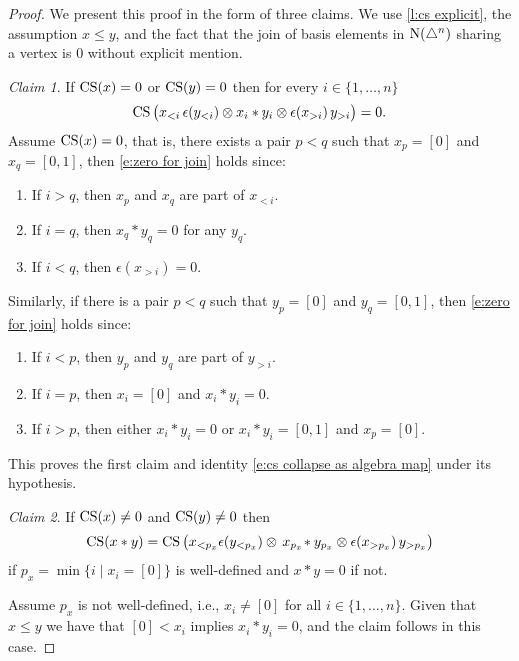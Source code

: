 \begin{proof}
	We present this proof in the form of three claims.
	We use \cref{l:cs explicit}, the assumption $x \leq y$, and the fact that the join of basis elements in $\operatorname{N}(\triangle^n)$ sharing a vertex is $0$ without explicit mention.

	\medskip\noindent \textit{Claim 1}.
	If $\operatorname{CS}(x) = 0$ or $\operatorname{CS}(y) = 0$ then for every $i \in \{1, \dots, n\}$
	\begin{equation} \label{e:zero for join}
		\operatorname{CS} \big( x_{<i}\, \epsilon(y_{<i}) \otimes x_i \ast y_i \otimes \epsilon(x_{>i}) \, y_{>i} \big) = 0.
	\end{equation}
	Assume $\operatorname{CS}(x) = 0$, that is, there exists a pair $p < q$ such that $x_p = [0]$ and $x_q = [0,1]$, then \eqref{e:zero for join} holds since:
	\begin{enumerate}
		\item If $i > q$, then $x_p$ and $x_q$ are part of $x_{<i}$.
		\item If $i = q$, then $x_q \ast y_q = 0$ for any $y_q$.
		\item If $i < q$, then $\epsilon(x_{>i}) = 0$.
	\end{enumerate}
	Similarly, if there is a pair $p < q$ such that $y_p = [0]$ and $y_q = [0,1]$, then \eqref{e:zero for join} holds since:
	\begin{enumerate}
		\item If $i < p$, then $y_p$ and $y_q$ are part of $y_{>i}$.
		\item If $i = p$, then $x_i = [0]$ and $x_i \ast y_i = 0$.
		\item If $i > p$, then either $x_i \ast y_i = 0$ or $x_i \ast y_i = [0,1]$ and $x_p = [0]$.
	\end{enumerate}
	This proves the first claim and identity \eqref{e:cs collapse as algebra map} under its hypothesis.

	\medskip\noindent \textit{Claim 2}.
	If $\operatorname{CS}(x) \neq 0$ and $\operatorname{CS}(y) \neq 0$ then
	\[
	\operatorname{CS}(x \ast y) =
	\operatorname{CS} \big( x_{<p_x} \epsilon(y_{<p_x}) \otimes \, x_{p_x} \! \ast y_{p_x} \otimes \epsilon(x_{>p_x}) \, y_{>p_x} \big)
	\]
	if $p_x = \min \big\{ i \mid x_i = [0] \big\}$ is well-defined and $x \ast y = 0$ if not.

	\medskip Assume $p_x$ is not well-defined, i.e., $x_i \neq [0]$ for all $i \in \{1, \dots, n\}$.
	Given that $x \leq y$ we have that $[0] < x_i$ implies $x_i \ast y_i = 0$, and the claim follows in this case.


\end{proof}
